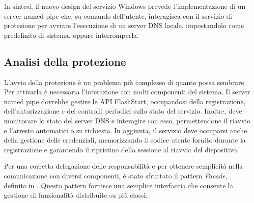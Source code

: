 \documentclass[12pt,a4paper,openright,twoside]{book}
\begin{document}
In sintesi, il nuovo design del servizio Windows prevede l'implementazione di un server named pipe che, su comando dell'utente, interagisca con il servizio di protezione per avviare l'esecuzione di un server \gls{DNS} locale, impostandolo come predefinito di sistema, oppure interromperla.

\subsection{Analisi della protezione}

L'avvio della protezione è un problema più complesso di quanto possa sembrare.
Per attivarla è necessaria l'interazione con molti componenti del sistema.
Il server named pipe dovrebbe gestire le API FlashStart, occupandosi della registrazione, dell'autorizzazione e dei controlli periodici sullo stato del servizio.
Inoltre, deve monitorare lo stato del server \gls{DNS} e interagire con esso, permettendone il riavvio e l'arresto automatici o su richiesta. 
In aggiunta, il servizio deve occuparsi anche della gestione delle credenziali, memorizzando il codice utente fornito durante la registrazione e garantendo il ripristino della sessione al riavvio del dispositivo.

Per una corretta delegazione delle responsabilità e per ottenere semplicità nella comunicazione con diversi componenti, è stato sfruttato il pattern \textit{Facade}, definito in \cite{GoF94}.
Questo pattern fornisce una semplice interfaccia che consente la gestione di funzionalità distribuite su più classi.
\end{document}
